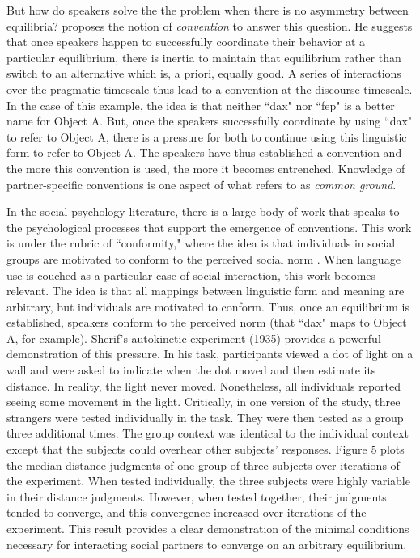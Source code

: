 \documentclass[man, noapacite, 12pt]{apa2}
\begin{document}
But how do speakers solve the the problem when there is no asymmetry between equilibria?  proposes the notion of {\it convention} to answer this question. He suggests that once speakers happen to successfully coordinate their behavior at a particular equilibrium, there is inertia to maintain that equilibrium rather than switch to an alternative which is, a priori, equally good. A series of  interactions over the pragmatic timescale thus lead to a convention at the discourse timescale. In the case of this example, the idea is that neither ``dax" nor ``fep" is a better name for Object A. But, once the speakers successfully coordinate by using ``dax" to refer to Object A, there is a pressure for both to continue using this linguistic form to refer to Object A. The speakers have thus established a convention and the more this convention is used, the more  it becomes entrenched. Knowledge of partner-specific conventions is one aspect of what  refers to as {\it common ground}.

In the social psychology literature, there is a large body of work that speaks to the psychological processes that support the emergence of conventions. This work is under the rubric of ``conformity," where the idea is that individuals in social groups are motivated to conform to the perceived social norm  \cite{cialdini2004social}. When language use is couched as a particular case of social interaction, this work becomes relevant. The idea is that all mappings between linguistic form and meaning are arbitrary, but individuals are motivated to conform. Thus, once an equilibrium is established, speakers conform to the perceived norm (that ``dax" maps to Object A, for example).  Sherif's autokinetic experiment (1935)\nocite{sherif1935} provides a powerful demonstration of this pressure. In his task, participants viewed a dot of light on a wall and were asked to indicate when the dot moved and then estimate its distance. In reality, the light never moved. Nonetheless, all individuals reported seeing some movement in the light. Critically, in one version of the study, three strangers  were tested individually in the task. They were then tested as a group three additional times. The group context was identical to the individual context except that the subjects could overhear other subjects' responses. Figure 5 plots the median distance judgments of one group of three subjects over iterations of the experiment. When tested individually, the three subjects were highly variable in their distance judgments. However, when tested together, their judgments tended to converge, and this convergence increased over iterations of the experiment. This result provides a clear demonstration of the minimal conditions necessary for interacting social partners to converge on an arbitrary equilibrium. 
\end{document}
